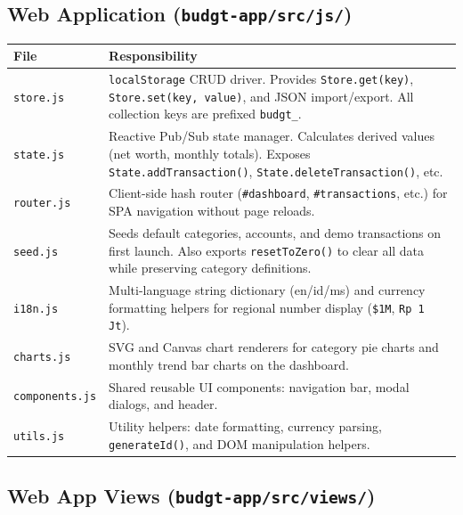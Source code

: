 \documentclass[12pt, a4paper]{article}
\begin{document}
\subsection{Web Application (\texttt{budgt-app/src/js/})}

\begin{longtable}{L{3.5cm} L{11cm}}
  \toprule
  \textbf{File} & \textbf{Responsibility} \\
  \midrule
  \endhead
  \texttt{store.js} & \texttt{localStorage} CRUD driver. Provides \texttt{Store.get(key)}, \texttt{Store.set(key, value)}, and JSON import/export. All collection keys are prefixed \texttt{budgt\_}. \\[4pt]
  \texttt{state.js} & Reactive Pub/Sub state manager. Calculates derived values (net worth, monthly totals). Exposes \texttt{State.addTransaction()}, \texttt{State.deleteTransaction()}, etc. \\[4pt]
  \texttt{router.js} & Client-side hash router (\texttt{\#dashboard}, \texttt{\#transactions}, etc.) for SPA navigation without page reloads. \\[4pt]
  \texttt{seed.js} & Seeds default categories, accounts, and demo transactions on first launch. Also exports \texttt{resetToZero()} to clear all data while preserving category definitions. \\[4pt]
  \texttt{i18n.js} & Multi-language string dictionary (en/id/ms) and currency formatting helpers for regional number display (\texttt{\$1M}, \texttt{Rp 1 Jt}). \\[4pt]
  \texttt{charts.js} & SVG and Canvas chart renderers for category pie charts and monthly trend bar charts on the dashboard. \\[4pt]
  \texttt{components.js} & Shared reusable UI components: navigation bar, modal dialogs, and header. \\[4pt]
  \texttt{utils.js} & Utility helpers: date formatting, currency parsing, \texttt{generateId()}, and DOM manipulation helpers. \\
  \bottomrule
\end{longtable}

\subsection{Web App Views (\texttt{budgt-app/src/views/})}
\end{document}
